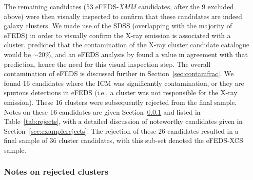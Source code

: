 \documentclass[fleqn,usenatbib]{mnras}
\begin{document}
The remaining candidates (53 eFEDS-{\em XMM} candidates, after the 9 excluded above) were then visually inspected to confirm that these candidates are indeed galaxy clusters.  We made use of the SDSS (overlapping with the majority of eFEDS) in order to visually confirm the X-ray emission is associated with a cluster.  \cite{simerass} predicted that the contamination of the X-ray cluster candidate catalogue would be ${\sim}$20\%, and an eFEDS analysis by \cite{efedsclusteropticalcat} found a value in agreement with that prediction, hence the need for this visual inspection step.  The overall contamination of eFEDS is discussed further in Section~\ref{sec:contamfrac}.  We found 16 candidates where the ICM was significantly contamination, or they are spurious detections in eFEDS (i.e., a cluster was not responsible for the X-ray emission).  These 16 clusters were subsequently rejected from the final sample.  Notes on these 16 candidates are given Section~\ref{sec:notes} and listed in Table~\ref{tab:rejects}, with a detailed discussion of noteworthy candidates given in Section~\ref{sec:examplerejects}.  The rejection of these 26 candidates resulted in a final sample of 36 cluster candidates, with this sub-set denoted the eFEDS-XCS sample. 

\subsubsection{Notes on rejected clusters}
\label{sec:notes}
\end{document}
